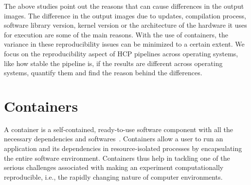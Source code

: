 The above studies point out the reasons that can cause differences in the output images. The difference in the output images due to updates, compilation process, software library version, kernel version or the architecture of the hardware it uses for execution are some of the main reasons. With the use of containers, the variance in these reproducibility issues can be minimized to a certain extent. We focus on the reproducibility aspect of HCP pipelines across operating systems, like how stable the pipeline is, if the results are different across operating systems, quantify them and find the reason behind the differences.

\section{Containers}
A container is a self-contained, ready-to-use software component with all the necessary dependencies and softwares~\cite{7158965}. Containers allow a user to run an application and its dependencies in resource-isolated processes by encapsulating the entire software environment. Containers thus help in tackling one of the serious challenges associated with making an experiment computationally reproducible, i.e., the rapidly changing nature of computer environments.
